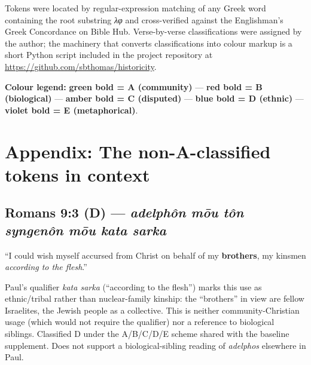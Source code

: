 \documentclass[11pt,oneside]{article}
\newcommand{\adeA}[1]{\textcolor{colorA}{\textbf{#1}}}
\newcommand{\adeB}[1]{\textcolor{colorB}{\textbf{#1}}}
\newcommand{\adeC}[1]{\textcolor{colorC}{\textbf{#1}}}
\newcommand{\adeD}[1]{\textcolor{colorD}{\textbf{#1}}}
\newcommand{\adeE}[1]{\textcolor{colorE}{\textbf{#1}}}
\begin{document}
Tokens were located by regular-expression matching of any Greek word
containing the root substring \textit{λφ} and cross-verified against
the Englishman's Greek Concordance on Bible Hub.  Verse-by-verse
classifications were assigned by the author; the machinery that
converts classifications into colour markup is a short Python script
included in the project repository at
\url{https://github.com/sbthomas/historicity}.

\vspace{0.5em}
\noindent\textbf{Colour legend:} \adeA{green bold = A (community)} —
\adeB{red bold = B (biological)} —
\adeC{amber bold = C (disputed)} —
\adeD{blue bold = D (ethnic)} —
\adeE{violet bold = E (metaphorical)}.

\clearpage




\clearpage


\section*{Appendix: The non-A-classified tokens in context}

\subsection*{Romans 9:3 \textbf{(D)} --- \textit{adelph\^on m\=ou t\^on syngen\^on m\=ou kata sarka}}

\noindent\enquote{I could wish myself accursed from Christ on behalf
of my \adeD{brothers}, my kinsmen \textit{according to the flesh}.}

Paul's qualifier \textit{kata sarka} (``according to the flesh'')
marks this use as ethnic/tribal rather than nuclear-family kinship:
the ``brothers'' in view are fellow Israelites, the Jewish people as
a collective.  This is neither community-Christian usage (which would
not require the qualifier) nor a reference to biological siblings.
Classified D under the A/B/C/D/E scheme shared with the baseline
supplement.  Does not support a biological-sibling reading of
\textit{adelphos} elsewhere in Paul.
\end{document}
